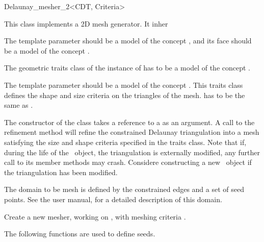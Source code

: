 \begin{ccRefClass}{Delaunay_mesher_2<CDT, Criteria>}

This class implements a 2D mesh generator. It inher

\ccParameters
The template parameter  should be a model of the concept
, and its face should be a model of
the concept .

The geometric traits class of the instance of  has to be
a model of the concept .

The template parameter  should be a model of the concept
. This traits class defines the shape and size
criteria on the triangles of the mesh.  has to
be the same as .


The constructor of the class \ccRefName{} takes a reference to a 
as an argument. A call to the refinement method  will
refine the constrained Delaunay triangulation into a mesh satisfying the
size and shape criteria specified in the traits class. Note that if, during
the life of the \ccRefName\ object, the triangulation is externally
modified, any further call to its member methods may crash. Considere
constructing a new \ccRefName\ object if the triangulation has been
modified.

The domain to be mesh is defined by the constrained edges and a set
of seed points. See the user manual, for a detailed description of this
domain.


\ccTypes 
{}

\ccCreation
{}

{Create a new mesher, working on , with meshing criteria
  .}


The following functions are used to define seeds.



\end{ccRefClass}

